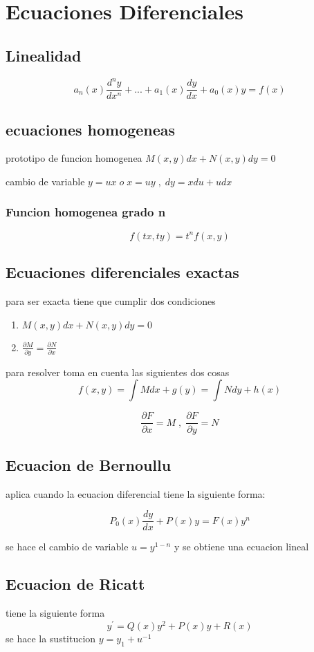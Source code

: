 \newpage
\section{Ecuaciones Diferenciales}
\subsection{Linealidad}
$$ a_n(x) \frac{d^ny}{dx^n} + ... +  a_1(x) \frac{dy}{dx} + a_0(x)y = f(x)$$ 
\subsection{ecuaciones homogeneas}
prototipo de funcion homogenea $M(x,y)dx + N(x,y)dy = 0$ 

cambio de variable $y=ux \; o \; x=uy \; , \; dy=xdu + udx $

\subsubsection{Funcion homogenea grado n}
$$f(tx,ty) = t^nf(x,y)$$
\subsection{Ecuaciones diferenciales exactas}
para ser exacta tiene que cumplir dos condiciones 
\begin{enumerate}
	\item $M(x,y)dx + N(x,y)dy = 0$
	\item $\frac{\partial M}{\partial y} = \frac{\partial N }{\partial x}$
\end{enumerate}
para resolver toma en cuenta las siguientes dos cosas
$$f(x,y) = \int M dx + g(y) = \int N dy + h(x) $$


$$ \frac{ \partial F}{ \partial x} = M \; , \; \frac{ \partial F }{ \partial y} = N $$

\subsection{Ecuacion de Bernoullu}
aplica cuando la ecuacion diferencial tiene la siguiente forma:

$$P_0(x)\frac{dy}{dx} + P(x)y = F(x)y^n$$

se hace el cambio de variable $u = y^{1-n}$ y se obtiene una ecuacion lineal

\subsection{Ecuacion de Ricatt}
 tiene la siguiente forma
  $$y^{'} = Q(x)y^{2} + P(x)y + R(x)$$
se hace la sustitucion $y=y_1 + u^{-1}$ 

